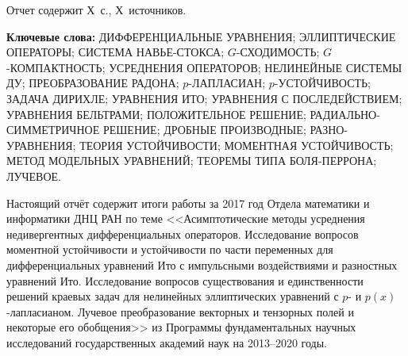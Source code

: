 \Referat %

Отчет содержит Х~с., Х~источников.%

 \bigskip
 \textbf{ Ключевые
  слова:}
  ДИФФЕРЕНЦИАЛЬНЫЕ УРАВНЕНИЯ; ЭЛЛИПТИЧЕСКИЕ ОПЕРАТОРЫ; СИСТЕМА НАВЬЕ-СТОКСА; $G$-СХОДИМОСТЬ; $G$-КОМПАКТНОСТЬ; УСРЕДНЕНИЯ ОПЕРАТОРОВ; НЕЛИНЕЙНЫЕ СИСТЕМЫ ДУ;
  ПРЕОБРАЗОВАНИЕ РАДОНА;
  $p$-ЛАПЛАСИАН; $p$-УСТОЙЧИВОСТЬ; ЗАДАЧА ДИРИХЛЕ; УРАВНЕНИЯ ИТО; УРАВНЕНИЯ С ПОСЛЕДЕЙСТВИЕМ;  УРАВНЕНИЯ БЕЛЬТРАМИ; ПОЛОЖИТЕЛЬНОЕ РЕШЕНИЕ; РАДИАЛЬНО-СИММЕТРИЧНОЕ РЕШЕНИЕ; ДРОБНЫЕ ПРОИЗВОДНЫЕ; РАЗНО- УРАВНЕНИЯ;  ТЕОРИЯ УСТОЙЧИВОСТИ; МОМЕНТНАЯ УСТОЙЧИВОСТЬ; МЕТОД МОДЕЛЬНЫХ УРАВНЕНИЙ; ТЕОРЕМЫ ТИПА БОЛЯ-ПЕРРОНА; ЛУЧЕВОЕ.

 \bigskip

Настоящий отчёт содержит итоги работы за 2017 год Отдела математики и информатики ДНЦ РАН по теме
<<Асимптотические методы усреднения недивергентных дифференциальных операторов. Исследование вопросов моментной устойчивости и устойчивости по части переменных для дифференциальных уравнений Ито с импульсными воздействиями и разностных уравнений Ито. Исследование вопросов существования и единственности решений краевых задач для нелинейных эллиптических уравнений с $p$- и $p(x)$-лапласианом. Лучевое преобразование векторных и тензорных полей и некоторые его обобщения>>
из Программы фундаментальных научных исследований государственных академий наук на 2013–2020 годы.




